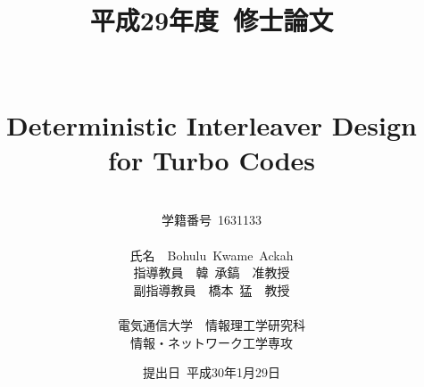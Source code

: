\documentclass[a4paper, 12pt, oneside, openary, titlepage]{jsarticle}
\begin{document}
\title{平成29年度~修士論文\\~\\~\\ Deterministic Interleaver Design for Turbo Codes}
\author{~\\ {\Large 学籍番号~1631133} \\~\\ {\Large 氏名~~Bohulu~Kwame~Ackah} \\ 
{\Large 指導教員~~韓~承鎬~~准教授} \\ 
{\Large 副指導教員~~橋本~猛~~教授} \\~\\ 
{\Large 電気通信大学~~情報理工学研究科} \\ {\Large 情報・ネットワーク工学専攻} \\ }
\date{{\Large 提出日~平成30年1月29日}}
\maketitle
\end{document}
